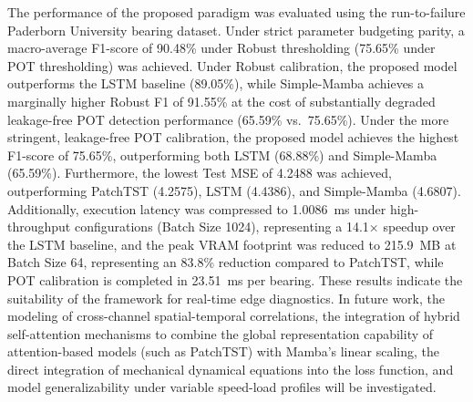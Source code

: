 \documentclass[cmes,article,submit,moreauthors,pdftex]{Definitions/tsp}
\begin{document}
The performance of the proposed paradigm was evaluated using the run-to-failure Paderborn University bearing dataset. Under strict parameter budgeting parity, a macro-average F1-score of 90.48\% under Robust thresholding (75.65\% under POT thresholding) was achieved. Under Robust calibration, the proposed model outperforms the LSTM baseline (89.05\%), while Simple-Mamba achieves a marginally higher Robust F1 of 91.55\% at the cost of substantially degraded leakage-free POT detection performance (65.59\% vs.\ 75.65\%). Under the more stringent, leakage-free POT calibration, the proposed model achieves the highest F1-score of 75.65\%, outperforming both LSTM (68.88\%) and Simple-Mamba (65.59\%). Furthermore, the lowest Test MSE of 4.2488 was achieved, outperforming PatchTST (4.2575), LSTM (4.4386), and Simple-Mamba (4.6807). Additionally, execution latency was compressed to 1.0086~ms under high-throughput configurations (Batch Size 1024), representing a 14.1$\times$ speedup over the LSTM baseline, and the peak VRAM footprint was reduced to 215.9~MB at Batch Size 64, representing an 83.8\% reduction compared to PatchTST, while POT calibration is completed in 23.51~ms per bearing. These results indicate the suitability of the framework for real-time edge diagnostics. In future work, the modeling of cross-channel spatial-temporal correlations, the integration of hybrid self-attention mechanisms to combine the global representation capability of attention-based models (such as PatchTST) with Mamba's linear scaling, the direct integration of mechanical dynamical equations into the loss function, and model generalizability under variable speed-load profiles will be investigated.



\end{document}
